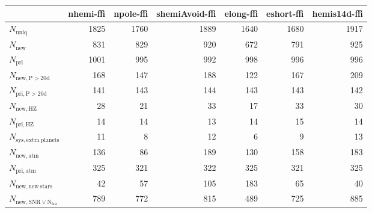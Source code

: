 \begin{tabular}{lrrrrrr}
\toprule
{} &  nhemi-ffi &  npole-ffi &  shemiAvoid-ffi &  elong-ffi &  eshort-ffi &  hemis14d-ffi \\
\midrule
$N_{\mathrm{uniq}}$                &       1825 &       1760 &            1889 &       1640 &        1680 &          1917 \\
$N_{\mathrm{new}}$                 &        831 &        829 &             920 &        672 &         791 &           925 \\
$N_{\mathrm{pri}}$                 &       1001 &        995 &             992 &        998 &         996 &           996 \\
$N_{\mathrm{new,P>20d}}$           &        168 &        147 &             188 &        122 &         167 &           209 \\
$N_{\mathrm{pri,P>20d}}$           &        141 &        143 &             144 &        143 &         143 &           142 \\
$N_{\mathrm{new,HZ}}$              &         28 &         21 &              33 &         17 &          33 &            30 \\
$N_{\mathrm{pri,HZ}}$              &         14 &         14 &              13 &         14 &          15 &            14 \\
$N_{\mathrm{sys,extra\ planets}}$  &         11 &          8 &              12 &          6 &           9 &            13 \\
$N_{\mathrm{new,atm}}$             &        136 &         86 &             189 &        130 &         158 &           183 \\
$N_{\mathrm{pri,atm}}$             &        325 &        321 &             322 &        325 &         321 &           325 \\
$N_{\mathrm{new,new\ stars}}$      &         42 &         57 &             105 &        183 &          65 &            40 \\
$N_{\mathrm{new,SNR\lor N_{tra}}}$ &        789 &        772 &             815 &        489 &         725 &           885 \\
\bottomrule
\end{tabular}
